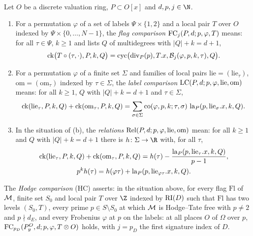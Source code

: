 \begin{definition}\label{pf:towergeo:def-fcc}
Let $O$ be a discrete valuation ring, $P\subset O[x]$ and $d,p,j\in\N$.
\begin{enumerate}[label=(\alph*)]
\item For a permutation $\varphi$ of a set of labels $\Psi\times\{1,2\}$ and a local pair $T$ over $O$
  indexed by $\Psi\times\{0,\dots,N-1\}$, the \emph{flag comparison} $\mathrm{FC}_j(P,d;p,\varphi,T)$ means:
  for all $\tau\in\Psi$, $k\ge1$ and lists $Q$ of multidegrees with $|Q|+k=d+1$,
  \begin{equation}\label{pf:towergeo:eq-fcc}
  \operatorname{ck}\bigl(T\circ(\tau,\cdot),P,k,Q\bigr)=\operatorname{cyc}\bigl(\operatorname{div}_P(p),T.x,\mathcal B_j(\varphi,p,k,\tau),Q\bigr).
  \end{equation}
\item For a permutation $\varphi$ of a finite set $\Sigma$ and families of local pairs
  $\mathrm{lie}=(\mathrm{lie}_\tau)$, $\mathrm{om}=(\mathrm{om}_\tau)$ indexed by $\tau\in\Sigma$, the
  \emph{label comparison} $\mathrm{LC}(P,d;p,\varphi,\mathrm{lie},\mathrm{om})$ means: for all $k\ge1$, $Q$
  with $|Q|+k=d+1$ and $\tau\in\Sigma$,
  \begin{equation}\label{pf:towergeo:eq-lcc}
  \operatorname{ck}(\mathrm{lie}_\tau,P,k,Q)+\operatorname{ck}(\mathrm{om}_\tau,P,k,Q)
  =\sum_{\sigma\in\Sigma}\operatorname{co}(\varphi,p,k;\tau,\sigma)\,\operatorname{la}_P(p,\mathrm{lie}_\sigma.x,k,Q).
  \end{equation}
\item In the situation of (b), the \emph{relations} $\mathrm{Rel}(P,d;p,\varphi,\mathrm{lie},\mathrm{om})$
  mean: for all $k\ge1$ and $Q$ with $|Q|+k=d+1$ there is $h\colon\Sigma\to\R$ with, for all $\tau$,
  \begin{gather}
  \operatorname{ck}(\mathrm{lie}_\tau,P,k,Q)+\operatorname{ck}(\mathrm{om}_\tau,P,k,Q)
  =h(\tau)-\frac{\operatorname{la}_P(p,\mathrm{lie}_\tau.x,k,Q)}{p-1},\label{pf:towergeo:eq-rel1}\\
  p^kh(\tau)=h(\varphi\tau)+\operatorname{la}_P(p,\mathrm{lie}_{\varphi\tau}.x,k,Q).\label{pf:towergeo:eq-rel2}
  \end{gather}
\end{enumerate}
\end{definition}

\begin{definition}\label{pf:towergeo:def-hlfb}
The \emph{Hodge comparison} \textup{(HC)} asserts: in the situation above, for every flag $\mathrm{Fl}$ of
$\mathcal M$, finite set $S_0$ and local pair $T$ over $\Z$ indexed by $\mathrm{RI}(D)$ such that
$\mathrm{Fl}$ has two levels $(S_0,T)$, every prime $p\in S\setminus S_0$ at which $\mathcal M$ is
Hodge--Tate free with $p\ne2$ and $p\nmid d_E$, and every Frobenius $\varphi$ at $p$ on the labels: at all
places $O$ of $\Omega$ over $p$, $\mathrm{FC}_{p_D}(P^O_y,d;p,\varphi,T\otimes O)$ holds, with $j=p_D$ the first
signature index of $D$.
\end{definition}

